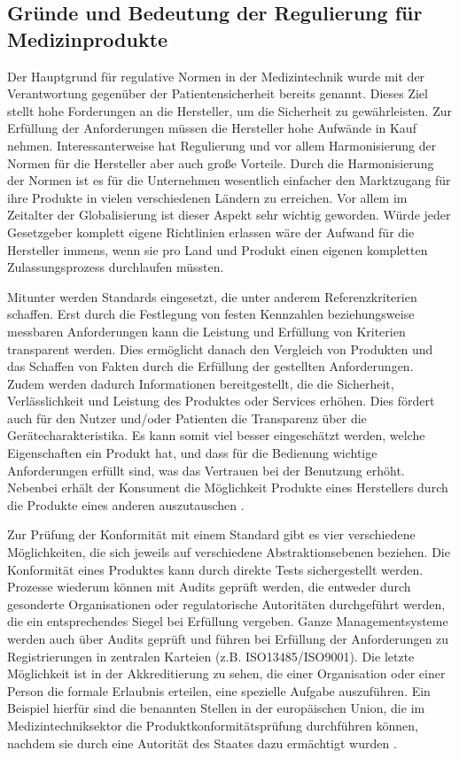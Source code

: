 \documentclass[a4paper,12pt]{report}
\begin{document}
\subsection{Gründe und Bedeutung der Regulierung für Medizinprodukte}\label{subsec:Gruende}
Der Hauptgrund für regulative Normen in der Medizintechnik wurde mit der Verantwortung gegenüber der Patientensicherheit bereits genannt. Dieses Ziel stellt hohe Forderungen an die Hersteller, um die Sicherheit zu gewährleisten. Zur Erfüllung der Anforderungen müssen die Hersteller hohe Aufwände in Kauf nehmen. Interessanterweise hat Regulierung und vor allem Harmonisierung der Normen für die Hersteller aber auch große Vorteile. Durch die Harmonisierung der Normen ist es für die Unternehmen wesentlich einfacher den Marktzugang für ihre Produkte in vielen verschiedenen Ländern zu erreichen. Vor allem im Zeitalter der Globalisierung ist dieser Aspekt sehr wichtig geworden. Würde jeder Gesetzgeber komplett eigene Richtlinien erlassen wäre der Aufwand für die Hersteller immens, wenn sie pro Land und Produkt einen eigenen kompletten Zulassungsprozess durchlaufen müssten.

Mitunter werden Standards eingesetzt, die unter anderem Referenzkriterien schaffen. Erst durch die Festlegung von festen Kennzahlen beziehungsweise messbaren Anforderungen kann die Leistung und Erfüllung von Kriterien transparent werden. Dies ermöglicht danach den Vergleich von Produkten und das Schaffen von Fakten durch die Erfüllung der gestellten Anforderungen. Zudem werden dadurch Informationen bereitgestellt, die die Sicherheit, Verlässlichkeit und Leistung des Produktes oder Services erhöhen. Dies fördert auch für den Nutzer und/oder Patienten die Transparenz über die Gerätecharakteristika. Es kann somit viel besser eingeschätzt werden, welche Eigenschaften ein Produkt hat, und dass für die Bedienung wichtige Anforderungen erfüllt sind, was das Vertrauen bei der Benutzung erhöht. Nebenbei erhält der Konsument die Möglichkeit Produkte eines Herstellers durch die Produkte eines anderen auszutauschen \citep[vgl.][S. 19.]{Cheng2003}.

Zur Prüfung der Konformität mit einem Standard gibt es vier verschiedene Möglichkeiten, die sich jeweils auf verschiedene Abstraktionsebenen beziehen. Die Konformität eines Produktes kann durch direkte Tests sichergestellt werden. Prozesse wiederum können mit Audits geprüft werden, die entweder durch gesonderte Organisationen oder regulatorische Autoritäten durchgeführt werden, die ein entsprechendes Siegel bei Erfüllung vergeben. Ganze Managementsysteme werden auch über Audits geprüft und führen bei Erfüllung der Anforderungen zu Registrierungen in zentralen Karteien (z.B. ISO13485/ISO9001). Die letzte Möglichkeit ist in der Akkreditierung zu sehen, die einer Organisation oder einer Person die formale Erlaubnis erteilen, eine spezielle Aufgabe auszuführen. Ein Beispiel hierfür sind die benannten Stellen in der europäischen Union, die im Medizintechniksektor die Produktkonformitätsprüfung durchführen können, nachdem sie durch eine Autorität des Staates dazu ermächtigt wurden \citep[vgl.][S. 19f]{Cheng2003}.
\end{document}
